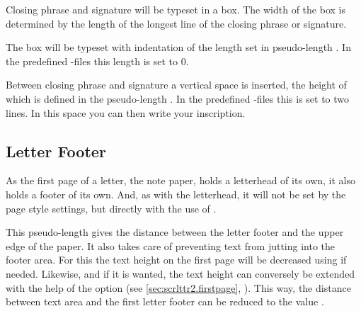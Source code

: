 \begin{Declaration}
\end{Declaration}
Closing phrase and signature will be
typeset in a box. The width of the box is determined by the length of the
longest line of the closing phrase or signature.

The box will be typeset with indentation of the length set in pseudo-length
. In the predefined
-files
this length is set to 0.

Between closing phrase and signature a vertical space is inserted, the height
of which is defined in the pseudo-length . In the
predefined
-files
this is set to two lines.  In this space you can then write your inscription.%
\EndIndexGroup
%
\EndIndexGroup


\subsection{Letter Footer}
%
\BeginIndexGroup
{}%


As the first page of a letter, the note paper, holds a letterhead of its own,
it also holds a footer of
its own. And, as with the letterhead, it will not be set by the page style
settings, but directly with the use of
.

\begin{Declaration}
\end{Declaration}
This pseudo-length gives the distance between the letter footer and the upper
edge of the paper. It also takes care of preventing text from jutting into the
footer area. For this the text height on the first page will be decreased
using %
 if needed.  Likewise, and if it is wanted,
the text height can conversely be extended with the help of the option
 (see
\autoref{sec:scrlttr2.firstpage},
). This way, the distance
between text area and the first letter footer can be reduced to the value
.

